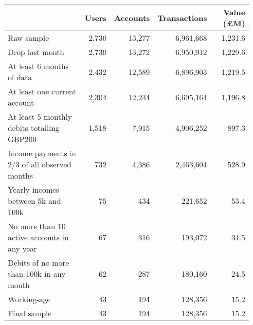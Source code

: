 \begin{tabular}{lrrrr}
\toprule
                                              & Users & Accounts & Transactions & Value (\pounds M) \\
\midrule
                                   Raw sample & 2,730 &   13,277 &    6,961,668 &           1,231.6 \\
                              Drop last month & 2,730 &   13,272 &    6,950,912 &           1,229.6 \\
                    At least 6 months of data & 2,432 &   12,589 &    6,896,903 &           1,219.5 \\
                 At least one current account & 2,304 &   12,234 &    6,695,164 &           1,196.8 \\
   At least 5 monthly debits totalling GBP200 & 1,518 &    7,915 &    4,906,252 &             897.3 \\
Income payments in 2/3 of all observed months &   732 &    4,386 &    2,463,604 &             528.9 \\
           Yearly incomes between 5k and 100k &    75 &      434 &      221,652 &              53.4 \\
  No more than 10 active accounts in any year &    67 &      316 &      193,072 &              34.5 \\
     Debits of no more than 100k in any month &    62 &      287 &      180,160 &              24.5 \\
                                  Working-age &    43 &      194 &      128,356 &              15.2 \\
                                 Final sample &    43 &      194 &      128,356 &              15.2 \\
\bottomrule
\end{tabular}
